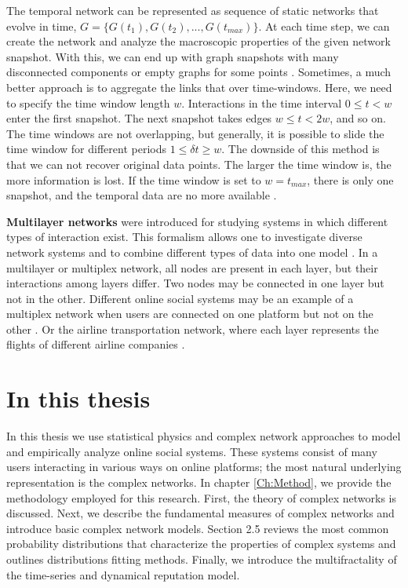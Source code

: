 The temporal network can be represented as sequence of static networks that evolve in time, $G = \{ G(t_1), G(t_2), ..., G(t_{max})\}$. At each time step, we can create the network and analyze the macroscopic properties of the given network snapshot. With this, we can end up with graph snapshots with many disconnected components or empty graphs for some points \cite{holme2015modern}. Sometimes, a much better approach is to aggregate the links that over time-windows. Here, we need to specify the time window length $w$. Interactions in the time interval $0\leq t<w$ enter the first snapshot. The next snapshot takes edges $w \leq t <2w$, and so on. The time windows are not overlapping, but generally, it is possible to slide the time window for different periods $ 1 \leq \delta t \geq w$. The downside of this method is that we can not recover original data points. The larger the time window is, the more information is lost. If the time window is set to $w=t_{max}$, there is only one snapshot, and the temporal data are no more available \cite{krings2012effects, arnold2021moving}. 

\textbf{Multilayer networks} were introduced for studying systems in which different types of interaction exist. This formalism allows one to investigate diverse network systems and to combine different types of data into one model \cite{porter2018multilayer}. In a multilayer or multiplex network, all nodes are present in each layer, but their interactions among layers differ. Two nodes may be connected in one layer but not in the other. Different online social systems may be an example of a multiplex network when users are connected on one platform but not on the other \cite{aleta2019multilayer}. Or the airline transportation network, where each layer represents the flights of different airline companies \cite{kivelamultilayer}.   

\newpage
\section{In this thesis}

In this thesis we use statistical physics and complex network approaches to model and empirically analyze online social systems. These systems consist of many users interacting in various ways on online platforms; the most natural underlying representation is the complex networks. In chapter \ref{Ch:Method}, we provide the methodology employed for this research. First, the theory of complex networks is discussed. Next, we describe the fundamental measures of complex networks and introduce basic complex network models. Section 2.5 reviews the most common probability distributions that characterize the properties of complex systems and outlines distributions fitting methods. Finally, we introduce the multifractality of the time-series and dynamical reputation model. 

